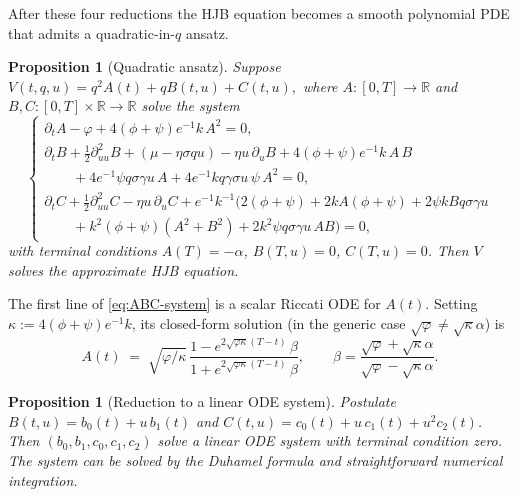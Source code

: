 \documentclass[11pt,a4paper]{article}
\theoremstyle{plain}
\newtheorem{proposition}[theorem]{Proposition}
\theoremstyle{definition}
\newcommand{\R}{\mathbb{R}}
\begin{document}
After these four reductions the HJB equation becomes a smooth polynomial
PDE that admits a quadratic-in-$q$ ansatz.

\begin{proposition}[Quadratic ansatz]
\label{prop:quad-ansatz}
Suppose
\(V(t,q,u) = q^2 A(t) + q B(t,u) + C(t,u),\)
where $A:[0,T]\to\R$ and $B,C:[0,T]\times\R\to\R$ solve the system
\begin{equation}
\label{eq:ABC-system}
\begin{cases}
  \partial_t A - \varphi + 4(\phi+\psi)e^{-1}k\,A^2 = 0, \\[2pt]
  \partial_t B + \tfrac12\partial^2_{uu}B + (\mu-\eta\sigma q u)
     - \eta u\,\partial_u B + 4(\phi+\psi)e^{-1}k\,A\,B \\
  \qquad + 4e^{-1}\psi q\sigma\gamma u\,A
     + 4 e^{-1} k q\gamma\sigma u\,\psi\,A^2 = 0, \\[2pt]
  \partial_t C + \tfrac12\partial^2_{uu}C - \eta u\,\partial_u C
     + e^{-1}k^{-1}\!\bigl(2(\phi+\psi) + 2kA(\phi+\psi)
        + 2\psi k B q\sigma\gamma u\\
  \qquad + k^2(\phi+\psi)(A^2+B^2) + 2k^2\psi q\sigma\gamma u\,A B\bigr) = 0,
\end{cases}
\end{equation}
with terminal conditions $A(T)=-\alpha$, $B(T,u)=0$, $C(T,u)=0$. Then $V$
solves the approximate HJB equation.
\end{proposition}

The first line of \eqref{eq:ABC-system} is a scalar Riccati ODE for
$A(t)$. Setting $\kappa := 4(\phi+\psi)e^{-1}k$, its closed-form solution
(in the generic case $\sqrt{\varphi}\ne\sqrt{\kappa}\alpha$) is
\begin{equation}
\label{eq:A-explicit}
  A(t) \;=\; \sqrt{\varphi/\kappa}\,
    \frac{1-e^{2\sqrt{\varphi\kappa}(T-t)}\,\beta}
         {1+e^{2\sqrt{\varphi\kappa}(T-t)}\,\beta},
  \qquad \beta = \frac{\sqrt{\varphi}+\sqrt{\kappa}\alpha}
                       {\sqrt{\varphi}-\sqrt{\kappa}\alpha}.
\end{equation}

\begin{proposition}[Reduction to a linear ODE system]
\label{prop:linear-odes}
Postulate $B(t,u) = b_0(t)+u\,b_1(t)$ and $C(t,u)=c_0(t)+u\,c_1(t)+u^2 c_2(t)$.
Then $(b_0,b_1,c_0,c_1,c_2)$ solve a linear ODE system with terminal
condition zero. The system can be solved by the Duhamel formula and
straightforward numerical integration.
\end{proposition}
\end{document}
